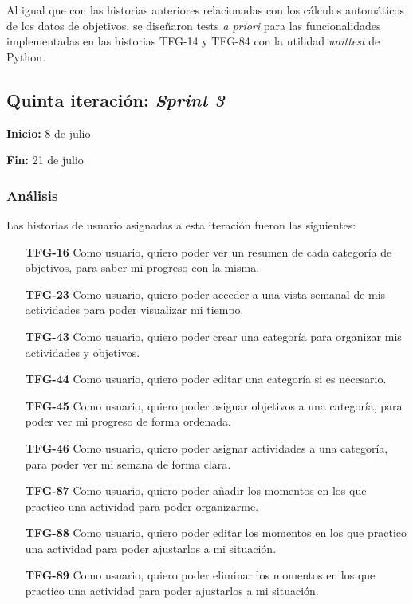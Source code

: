 \documentclass[10pt, a4paper]{aqademic}
\begin{document}
Al igual que con las historias anteriores relacionadas con los cálculos automáticos de los datos de objetivos, se diseñaron tests \textit{a priori} para las funcionalidades implementadas en las historias TFG-14 y TFG-84 con la utilidad \textit{unittest} de Python.


\subsection{Quinta iteración: \textit{Sprint 3}}

\textbf{Inicio:} 8 de julio

\textbf{Fin:} 21 de julio

\subsubsection{Análisis}

Las historias de usuario asignadas a esta iteración fueron las siguientes:

\begin{itemize}[leftmargin=16mm]
	\item [\textbf{TFG-16}] Como usuario, quiero poder ver un resumen de cada categoría de objetivos, para saber mi progreso con la misma.
	
	\item [\textbf{TFG-23}] Como usuario, quiero poder acceder a una vista semanal de mis actividades para poder visualizar mi tiempo.
	
	\item [\textbf{TFG-43}] Como usuario, quiero poder crear una categoría para organizar mis actividades y objetivos.
	
	\item [\textbf{TFG-44}] Como usuario, quiero poder editar una categoría si es necesario.
	
	\item [\textbf{TFG-45}] Como usuario, quiero poder asignar objetivos a una categoría, para poder ver mi progreso de forma ordenada.
	
	\item [\textbf{TFG-46}] Como usuario, quiero poder asignar actividades a una categoría, para poder ver mi semana de forma clara.
	
	\item [\textbf{TFG-87}] Como usuario, quiero poder añadir los momentos en los que practico una actividad para poder organizarme.
	
	\item [\textbf{TFG-88}] Como usuario, quiero poder editar los momentos en los que practico una actividad para poder ajustarlos a mi situación.
	
	\item [\textbf{TFG-89}] Como usuario, quiero poder eliminar los momentos en los que practico una actividad para poder ajustarlos a mi situación.
\end{itemize}
\end{document}
